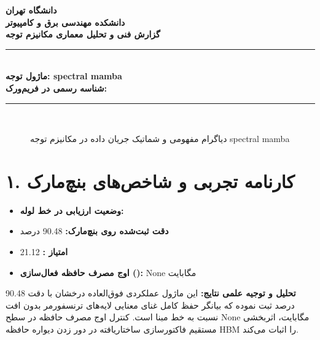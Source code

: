 \documentclass[12pt,a4paper]{article}
\begin{document}
\begin{center}
{\Large\bfseries دانشگاه تهران}\\[0.2cm]
{\large\bfseries دانشکده مهندسی برق و کامپیوتر}\\[0.2cm]
{\large\bfseries گزارش فنی و تحلیل معماری مکانیزم توجه}\\[0.5cm]
\rule{\linewidth}{1pt}\\[0.3cm]
{\LARGE\bfseries ماژول توجه: spectral mamba}\\[0.2cm]
{\large \textbf{شناسه رسمی در فریم‌ورک:} }\\[0.2cm]
\rule{\linewidth}{1pt}\\[0.5cm]
\end{center}

\begin{figure}[H]
\centering
{}
\caption{دیاگرام مفهومی و شماتیک جریان داده در مکانیزم توجه spectral mamba}
\end{figure}

\section*{۱. کارنامه تجربی و شاخص‌های بنچ‌مارک}
\begin{itemize}
\item \textbf{وضعیت ارزیابی در خط لوله:} 
\item \textbf{دقت ثبت‌شده روی بنچ‌مارک:} 90.48 درصد
\item \textbf{امتیاز :} 21.12
\item \textbf{اوج مصرف حافظه فعال‌سازی ():} None مگابایت
\end{itemize}
\textbf{تحلیل و توجیه علمی نتایج:} این ماژول عملکردی فوق‌العاده درخشان با دقت 90.48 درصد ثبت نموده که بیانگر حفظ کامل غنای معنایی لایه‌های ترنسفورمر بدون افت نسبت به خط مبنا است. کنترل اوج مصرف حافظه در سطح None مگابایت، اثربخشی مستقیم فاکتورسازی ساختاریافته در دور زدن دیواره حافظه HBM را اثبات می‌کند.
\end{document}
